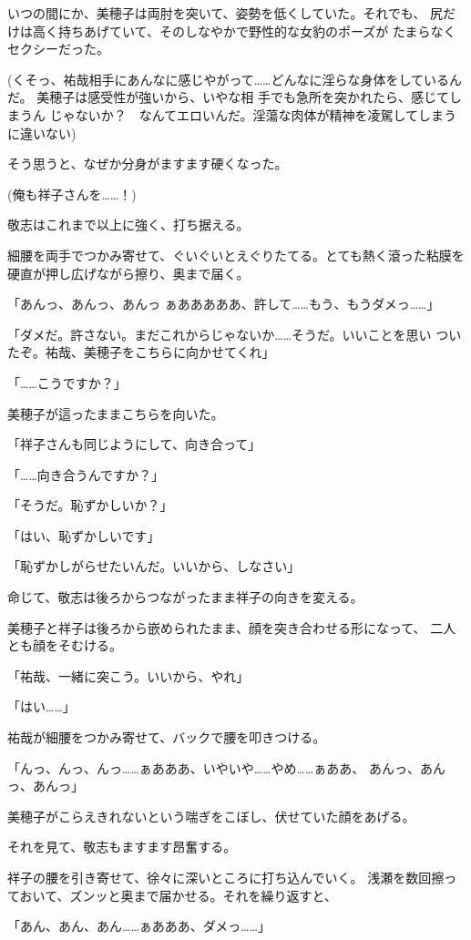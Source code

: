 ﻿\documentclass[
    book,tate,
    line_length=30zw,
    jafontsize=12pt,
    paper=b5j,
    landscape,
    ]{jlreq}
\begin{document}
いつの間にか、美穂子は両肘を突いて、姿勢を低くしていた。それでも、
尻だけは高く持ちあげていて、そのしなやかで野性的な女豹のポーズが
たまらなくセクシーだった。

(くそっ、祐哉相手にあんなに感じやがって……どんなに淫らな身体をしているんだ。
美穂子は感受性が強いから、いやな相 手でも急所を突かれたら、感じてしまうん
じゃないか？　なんてエロいんだ。淫蕩な肉体が精神を凌駕してしまうに違いない)

そう思うと、なぜか分身がますます硬くなった。

(俺も祥子さんを……！)

敬志はこれまで以上に強く、打ち据える。

細腰を両手でつかみ寄せて、ぐいぐいとえぐりたてる。とても熱く滾った粘膜を
硬直が押し広げながら擦り、奥まで届く。

「あんっ、あんっ、あんっ ぁあああああ、許して……もう、もうダメっ……」

「ダメだ。許さない。まだこれからじゃないか……そうだ。いいことを思い
ついたぞ。祐哉、美穂子をこちらに向かせてくれ」

「……こうですか？」

美穂子が這ったままこちらを向いた。

「祥子さんも同じようにして、向き合って」

「……向き合うんですか？」

「そうだ。恥ずかしいか？」

「はい、恥ずかしいです」

「恥ずかしがらせたいんだ。いいから、しなさい」

命じて、敬志は後ろからつながったまま祥子の向きを変える。

美穂子と祥子は後ろから嵌められたまま、顔を突き合わせる形になって、
二人とも顔をそむける。

「祐哉、一緒に突こう。いいから、やれ」

「はい……」

祐哉が細腰をつかみ寄せて、バックで腰を叩きつける。

「んっ、んっ、んっ……ぁあああ、いやいや……やめ……ぁああ、
あんっ、あんっ、あんっ」

美穂子がこらえきれないという喘ぎをこぼし、伏せていた顔をあげる。

それを見て、敬志もますます昂奮する。

祥子の腰を引き寄せて、徐々に深いところに打ち込んでいく。
浅瀬を数回擦っておいて、ズンッと奥まで届かせる。それを繰り返すと、

「あん、あん、あん……ぁあああ、ダメっ……」
\end{document}
